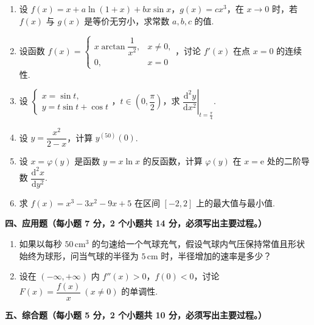 \documentclass[a4paper,11pt]{ctexart}
\newcommand{\e}{\mathrm{e}}
\newcommand{\dd}{\mathrm{d}}
\begin{document}
\begin{enumerate}[label=\arabic*., start=11, leftmargin=2em, itemsep=0.9em, topsep=0.5em]
  \item 设 $f(x) = x + a\ln(1+x) + bx\sin x$，$g(x) = cx^3$，在 $x\to 0$ 时，若 $f(x)$ 与 $g(x)$ 是等价无穷小，求常数 $a, b, c$ 的值.

  \item 设函数 $f(x) = \begin{cases} x\arctan\dfrac{1}{x^2}, & x\neq 0, \\[0.4em] 0, & x=0 \end{cases}$，讨论 $f'(x)$ 在点 $x=0$ 的连续性.

  \item 设 $\begin{cases} x = \sin t, \\ y = t\sin t + \cos t \end{cases}$，$t \in \left(0, \dfrac{\pi}{2}\right)$，求 $\left.\dfrac{\dd^2 y}{\dd x^2}\right|_{t=\frac{\pi}{4}}$.

  \item 设 $y = \dfrac{x^2}{2-x}$，计算 $y^{(50)}(0)$.

  \item 设 $x = \varphi(y)$ 是函数 $y = x\ln x$ 的反函数，计算 $\varphi(y)$ 在 $x = \e$ 处的二阶导数 $\dfrac{\dd^2 x}{\dd y^2}$.

  \item 求 $f(x) = x^3 - 3x^2 - 9x + 5$ 在区间 $[-2, 2]$ 上的最大值与最小值.
\end{enumerate}

\vspace{0.8em}

\textbf{四、应用题（每小题 7 分，2 个小题共 14 分，必须写出主要过程。）}

\begin{enumerate}[label=\arabic*., start=17, leftmargin=2em, itemsep=0.9em, topsep=0.5em]
  \item 如果以每秒 $50\,\mathrm{cm}^3$ 的匀速给一个气球充气，假设气球内气压保持常值且形状始终为球形，问当气球的半径为 $5\,\mathrm{cm}$ 时，半径增加的速率是多少？

  \item 设在 $(-\infty, +\infty)$ 内 $f''(x) > 0$，$f(0) < 0$，讨论 $F(x) = \dfrac{f(x)}{x}~(x\neq 0)$ 的单调性.
\end{enumerate}

\vspace{0.8em}

\textbf{五、综合题（每小题 5 分，2 个小题共 10 分，必须写出主要过程。）}
\end{document}
